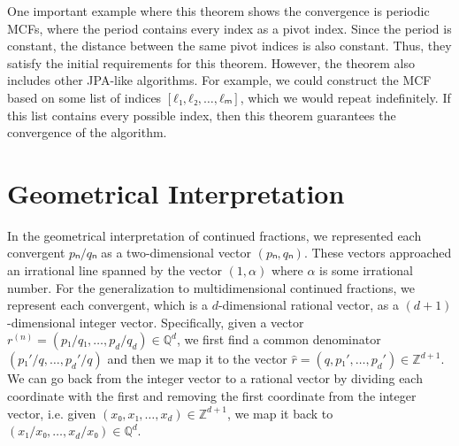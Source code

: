 One important example where this theorem shows the convergence is periodic MCFs,
where the period contains every index as a pivot index.
Since the period is constant,
the distance between the same pivot indices is also constant.
Thus, they satisfy the initial requirements for this theorem.
However, the theorem also includes other JPA-like algorithms.
For example, we could construct the MCF based on some list of indices $[ℓ₁, ℓ₂, …, ℓₘ]$,
which we would repeat indefinitely.
If this list contains every possible index,
then this theorem guarantees the convergence of the algorithm.

\section{Geometrical Interpretation}
\label{sec:mdcf-geometry}

In the geometrical interpretation of continued fractions,
we represented each convergent $pₙ/qₙ$ as a two-dimensional vector $(pₙ, qₙ)$.
These vectors approached an irrational line spanned by the vector $(1, α)$
where $α$ is some irrational number.
For the generalization to multidimensional continued fractions,
we represent each convergent,
which is a $d$-dimensional rational vector,
as a $(d+1)$-dimensional integer vector.
Specifically, given a vector $r^{(n)} = (p₁/q₁, …, p_d/q_d) ∈ ℚ^d$,
we first find a common denominator $(p₁'/q, …, p_d'/q)$ and
then we map it to the vector $\hat r = (q, p₁', …, p_d') ∈ ℤ^{d+1}$.
We can go back from the integer vector to a rational vector
by dividing each coordinate with the first and
removing the first coordinate from the integer vector,
i.e. given $(x₀, x₁, …, x_d) ∈ ℤ^{d+1}$, we map it back to $(x₁/x₀, …, x_d/x₀) ∈ ℚ^d$.

